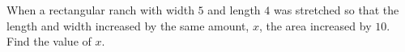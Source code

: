 When a rectangular ranch with width $5$ and length $4$ was stretched so that the length and width increased by the same amount, $x$, the area increased by $10$. Find the value of $x$.
